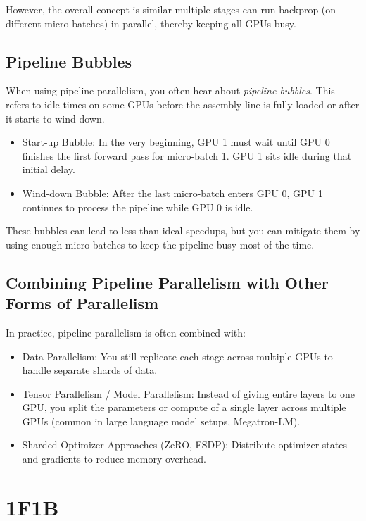 {However, the overall concept is similar-multiple stages can run backprop (on different micro-batches) in parallel, thereby keeping all GPUs busy.


\subsection{Pipeline Bubbles}

When using pipeline parallelism, you often hear about \textit{pipeline bubbles}. This refers to idle times on some GPUs before the assembly line is fully loaded or after it starts to wind down. 
\begin{itemize}
	\item Start-up Bubble: In the very beginning, GPU 1 must wait until GPU 0 finishes the first forward pass for micro-batch 1. GPU 1 sits idle during that initial delay.  
	\item Wind-down Bubble: After the last micro-batch enters GPU 0, GPU 1 continues to process the pipeline while GPU 0 is idle.
\end{itemize}

These bubbles can lead to less-than-ideal speedups, but you can mitigate them by using enough micro-batches to keep the pipeline busy most of the time.

\subsection{Combining Pipeline Parallelism with Other Forms of Parallelism}

In practice, pipeline parallelism is often combined with:
\begin{itemize}
	\item Data Parallelism: You still replicate each stage across multiple GPUs to handle separate shards of data.  
	\item Tensor Parallelism / Model Parallelism: Instead of giving entire layers to one GPU, you split the parameters or compute of a single layer across multiple GPUs (common in large language model setups, \eg Megatron-LM).  
	\item Sharded Optimizer Approaches (\eg ZeRO, FSDP): Distribute optimizer states and gradients to reduce memory overhead.
\end{itemize}


\section{1F1B}

}
